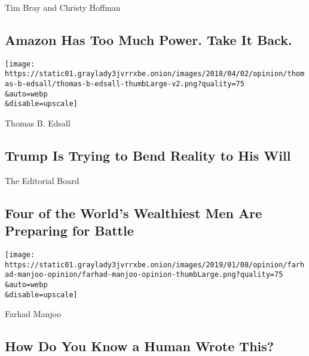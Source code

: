 \href{/2020/07/29/opinion/amazon-union-congress-antitrust.html}{}

Tim Bray and Christy Hoffman

\hypertarget{amazon-has-too-much-power-take-it-back}{%
\subsection{Amazon Has Too Much Power. Take It
Back.}\label{amazon-has-too-much-power-take-it-back}}

\href{/2020/07/29/opinion/trump-2020-populism.html}{}

\texttt{[image: https://static01.graylady3jvrrxbe.onion/images/2018/04/02/opinion/thomas-b-edsall/thomas-b-edsall-thumbLarge-v2.png?quality=75\\\&auto=webp\\\&disable=upscale]}

Thomas B. Edsall

\hypertarget{trump-is-trying-to-bend-reality-to-his-will}{%
\subsection{Trump Is Trying to Bend Reality to His
Will}\label{trump-is-trying-to-bend-reality-to-his-will}}

\href{/2020/07/28/opinion/tech-ceo-hearing-congress.html}{}

The Editorial Board

\hypertarget{four-of-the-worlds-wealthiest-men-are-preparing-for-battle}{%
\subsection{Four of the World's Wealthiest Men Are Preparing for
Battle}\label{four-of-the-worlds-wealthiest-men-are-preparing-for-battle}}

\href{/2020/07/29/opinion/gpt-3-ai-automation.html}{}

\texttt{[image: https://static01.graylady3jvrrxbe.onion/images/2019/01/08/opinion/farhad-manjoo-opinion/farhad-manjoo-opinion-thumbLarge.png?quality=75\\\&auto=webp\\\&disable=upscale]}

Farhad Manjoo

\hypertarget{how-do-you-know-a-human-wrote-this}{%
\subsection{How Do You Know a Human Wrote
This?}\label{how-do-you-know-a-human-wrote-this}}

\href{/2020/07/29/opinion/food-covid-quarantine-clay.html}{}

